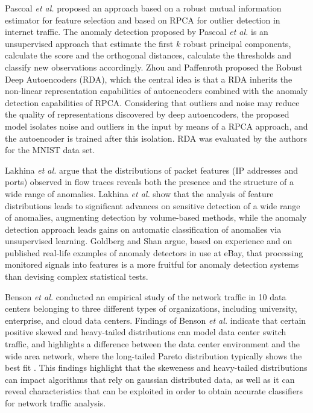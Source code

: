 \documentclass[review]{elsarticle}
\begin{document}
Pascoal \emph{et al.} \cite{pascoal2012robust} proposed an approach based on a robust mutual information estimator for feature selection and based on RPCA for outlier detection in internet traffic. The anomaly detection proposed by Pascoal \emph{et al.} is an unsupervised approach that estimate the first $k$ robust principal components, calculate the score and the orthogonal distances, calculate the thresholds and classify new observations accordingly. 	Zhou and Paffenroth \cite{zhou2017anomaly} proposed the Robust Deep Autoencoders (RDA), which the central idea is that a RDA inherits the non-linear representation capabilities of autoencoders combined with the anomaly detection capabilities of RPCA. Considering that outliers and noise may reduce the quality of representations discovered by deep autoencoders, the proposed model isolates noise and outliers in the input by means of a RPCA approach, and the autoencoder is trained after this isolation. RDA was evaluated by the authors for the MNIST data set.

Lakhina \emph{et al.} \cite{lakhina2005mining} argue that the distributions of packet features (IP addresses and ports) observed in flow traces reveals both the presence and the structure of a wide range of anomalies. Lakhina \emph{et al.} show that the analysis of feature distributions leads to significant advances on sensitive detection of a wide range of anomalies, augmenting detection by volume-based methods, while the anomaly detection approach leads gains on automatic classification of anomalies via unsupervised learning. Goldberg and Shan \cite{goldberg2015importance} argue, based on experience and on published real-life examples of anomaly detectors in use at eBay, that processing monitored signals into features is a more fruitful for anomaly detection systems than devising complex statistical tests.

Benson \emph{et al.} \cite{benson2010network} conducted an empirical study of the network traffic in 10 data centers belonging to three different types of organizations, including university, enterprise, and cloud data centers. Findings of Benson \emph{et al.} indicate that certain positive skewed and heavy-tailed distributions can model data center switch traffic, and highlights a difference between the data center environment and the wide area network, where the long-tailed Pareto distribution typically shows the best fit \cite{benson2010network}. This findings highlight that the skeweness and heavy-tailed distributions can impact algorithms that rely on gaussian distributed data, as well as it can reveal characteristics that can be exploited in order to obtain accurate classifiers for network traffic analysis. 
\end{document}
